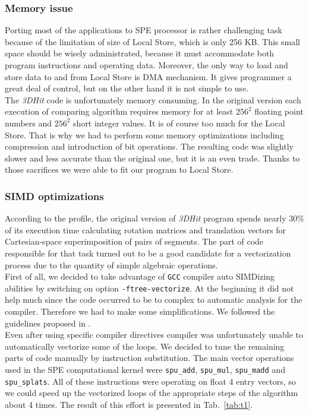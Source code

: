 \documentclass[envcountsame,envcountchap]{svmono}
\newcommand{\prog}{\emph{3DHit}}
\begin{document}
\subsubsection{Memory issue}
Porting most of the applications to SPE processor is rather challenging task
because of the limitation of size of Local Store, which is only 256 KB.
This small space should be wisely administrated, because it must accommodate
both program instructions and operating data.
Moreover, the only way to load and store data to and from Local Store is DMA
mechanism.
It gives programmer a great deal of control, but on the other hand it is not
simple to use.\\
The \prog{} code is unfortunately memory consuming.
In the original version each execution of comparing algorithm requires memory
for at least $256^2$ floating point numbers and $256^2$ short integer values.
It is of course too much for the Local Store.
That is why we had to perform some memory optimizations including compression
and introduction of bit operations.
The resulting code was slightly slower and less accurate than the original one,
but it is an even trade.
Thanks to those sacrifices we were able to fit our program to Local Store.

\subsubsection{SIMD optimizations}
According to the profile, the original version of \prog{} program spends nearly
$30\%$ of its execution time calculating rotation matrices and translation
vectors for Cartesian-space superimposition of pairs of segments.
The part of code responsible for that task turned out to be a good candidate for
a vectorization process due to the quantity of simple algebraic operations.\\
First of all, we decided to take advantage of \texttt{GCC} compiler auto
SIMDizing abilities by switching on option \texttt{-ftree-vectorize}.
At the beginning it did not help much since the code occurred to be to complex
to automatic analysis for the compiler.
Therefore we had to make some simplifications.
We followed the guidelines proposed in \cite{rb}. \\
Even after using specific compiler directives compiler was unfortunately unable
to automatically vectorize some of the loops.
We decided to tune the remaining parts of code manually by instruction
substitution.
The main vector operations used in the SPE computational kernel were
\texttt{spu\_add}, \texttt{spu\_mul}, \texttt{spu\_madd} and
\texttt{spu\_splats}.
All of these instructions were operating on float 4 entry vectors, so we could
speed up the vectorized loops of the appropriate steps of the algorithm about
4 times.
The result of this effort is presented in Tab.~\ref{tab:t1}.
\end{document}
